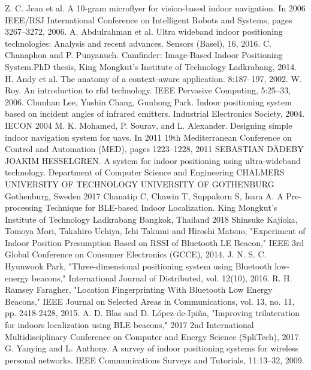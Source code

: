 \renewcommand{\bibname}{References}

\begin{thebibliography}{2}

Z. C. Jean et al. A 10-gram microflyer for vision-based indoor navigation. In 2006 IEEE/RSJ International Conference on Intelligent Robots and Systems, pages 3267–3272, 2006.
A. Abdulrahman et al. Ultra wideband indoor positioning technologies: Analysis and recent advances. Sensors (Basel), 16, 2016.
C. Chanaphon and P. Punyanuch. Camfinder: Image-Based Indoor Positioning System.PhD thesis, King Mongkut’s Institute of Technology Ladkrabang, 2014.
H. Andy et al. The anatomy of a context-aware application. 8:187–197, 2002.
W. Roy. An introduction to rfid technology. IEEE Pervasive Computing, 5:25–33, 2006.
Chunhan Lee, Yushin Chang, Gunhong Park. Indoor positioning system based on incident angles of infrared emitters. Industrial Electronics Society, 2004. IECON 2004
M. K. Mohamed, P. Sourav, and L. Alexander. Designing simple indoor navigation system for uavs. In 2011 19th Mediterranean Conference on Control and Automation (MED), pages 1223–1228, 2011
SEBASTIAN DÄDEBY JOAKIM HESSELGREN. A system for indoor positioning using ultra-wideband technology. Department of Computer Science and Engineering CHALMERS UNIVERSITY OF TECHNOLOGY UNIVERSITY OF GOTHENBURG Gothenburg, Sweden 2017
Chanatip C, Chawin T, Suppakorn S, Isara A. A Pre-processing Technique for BLE-based Indoor Localization. King Mongkut’s Institute of Technology Ladkrabang	Bangkok, Thailand 2018
Shinsuke Kajioka, Tomoya Mori, Takahiro Uchiya, Ichi Takumi and Hiroshi Matsuo, "Experiment of Indoor Position Presumption Based on RSSI of Bluetooth LE Beacon," IEEE 3rd Global Conference on Consumer Electronics (GCCE), 2014.
J. N. S. C. Hyunwook Park, "Three-dimensional positioning system using Bluetooth low-energy beacons," International Journal of Distributed, vol. 12(10), 2016. 
R. H. Ramsey Faragher, "Location Fingerprinting With Bluetooth Low Energy Beacons," IEEE Journal on Selected Areas in Communications, vol. 13, no. 11, pp. 2418-2428, 2015.
A. D. Blas and D. López-de-Ipiña, "Improving trilateration for indoors localization using BLE beacons," 2017 2nd International Multidisciplinary Conference on Computer and Energy Science (SpliTech), 2017.
G. Yanying and L. Anthony. A survey of indoor positioning systems for wireless personal networks. IEEE Communications Surveys and Tutorials, 11:13–32, 2009.

\end{thebibliography}
